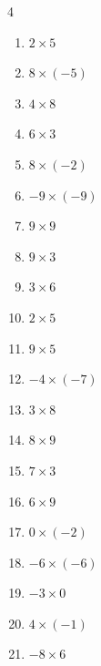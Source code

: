 \begin{multicols}{4}
\begin{enumerate}
  \item $2\times 5$
        \phantom{$=10$}

  \item $8\times (-5)$
        \phantom{$=-40$}

\columnbreak %

  \item $4\times 8$
        \phantom{$=32$}

  \item $6\times 3$
        \phantom{$=18$}

  \item $8\times (-2)$
        \phantom{$=-16$}

  \item $-9\times (-9)$
        \phantom{$=81$}

  \item $9\times 9$
        \phantom{$=81$}

  \item $9\times 3$
        \phantom{$=27$}

  \item $3\times 6$
        \phantom{$=18$}

  \item $2\times 5$
        \phantom{$=10$}

  \item $9\times 5$
        \phantom{$=45$}

  \item $-4\times (-7)$
        \phantom{$=28$}

  \item $3\times 8$
        \phantom{$=24$}

  \item $8\times 9$
        \phantom{$=72$}

  \item $7\times 3$
        \phantom{$=21$}

  \item $6\times 9$
        \phantom{$=54$}

  \item $0\times (-2)$
        \phantom{$=0$}

  \item $-6\times (-6)$
        \phantom{$=36$}

  \item $-3\times 0$
        \phantom{$=0$}

  \item $4\times (-1)$
        \phantom{$=-4$}

  \item $-8\times 6$
        \phantom{$=-48$}


\end{enumerate}
\end{multicols}
